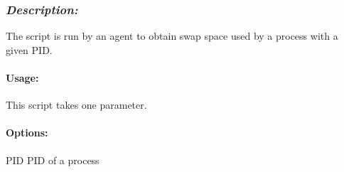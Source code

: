     \subsubsection{{\em Description:}}

    The script is run by an agent to obtain swap space used by a process with a given PID. 
    
    \paragraph{Usage:}
        This script takes one parameter.
        
    \paragraph{Options:}
    \begin{description}
      	\item PID      PID of a process 
    \end{description}       

